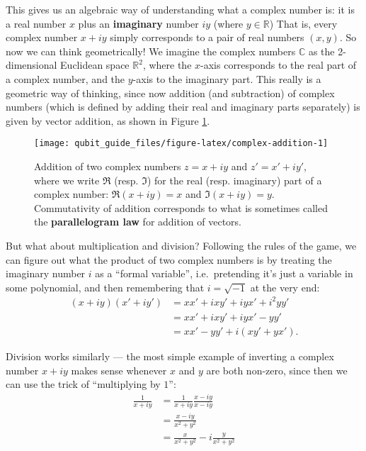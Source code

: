 \documentclass[fleqn]{article}
\begin{document}
This gives us an algebraic way of understanding what a complex number is: it is a real number \(x\) plus an \textbf{imaginary} number \(iy\) (where \(y\in\mathbb{R}\))
That is, every complex number \(x+iy\) simply corresponds to a pair of real numbers \((x,y)\).
So now we can think geometrically!
We imagine the complex numbers \(\mathbb{C}\) as the 2-dimensional Euclidean space \(\mathbb{R}^2\), where the \(x\)-axis corresponds to the real part of a complex number, and the \(y\)-axis to the imaginary part.
This really is a geometric way of thinking, since now addition (and subtraction) of complex numbers (which is defined by adding their real and imaginary parts separately) is given by vector addition, as shown in Figure \ref{fig:complex-addition}.



\begin{figure}[H]

{\centering \texttt{[image: qubit\_guide\_files/figure-latex/complex-addition-1]} 

}

\caption{Addition of two complex numbers \(z=x+iy\) and \(z'=x'+iy'\), where we write \(\Re\) (resp. \(\Im\)) for the real (resp. imaginary) part of a complex number: \(\Re(x+iy)=x\) and \(\Im(x+iy)=y\). Commutativity of addition corresponds to what is sometimes called the \textbf{parallelogram law} for addition of vectors.}\label{fig:complex-addition}
\end{figure}

But what about multiplication and division?
Following the rules of the game, we can figure out what the product of two complex numbers is by treating the imaginary number \(i\) as a ``formal variable'', i.e.~pretending it's just a variable in some polynomial, and then remembering that \(i=\sqrt{-1}\) at the very end:
\[
  \begin{aligned}
    (x+iy)(x'+iy')
    &= xx'+ixy'+iyx'+i^2yy'
  \\&= xx'+ixy'+iyx'-yy'
  \\&= xx'-yy'+i(xy'+yx').
  \end{aligned}
\]

Division works similarly --- the most simple example of inverting a complex number \(x+iy\) makes sense whenever \(x\) and \(y\) are both non-zero, since then we can use the trick of ``multiplying by \(1\)'':
\[
  \begin{aligned}
    \frac{1}{x+iy}
    &= \frac{1}{x+iy}\frac{x-iy}{x-iy}
  \\&= \frac{x-iy}{x^2+y^2}
  \\&= \frac{x}{x^2+y^2}-i\frac{y}{x^2+y^2}
  \end{aligned}
\]
\end{document}
